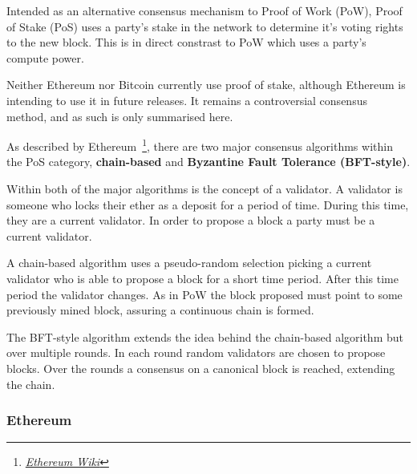 Intended as an alternative consensus mechanism to Proof of Work (PoW), Proof of Stake (PoS) uses a party's stake in the network to determine it's voting rights to the new block. This is in direct constrast to PoW which uses a party's compute power.

Neither Ethereum nor Bitcoin currently use proof of stake, although Ethereum is intending to use it in future releases. It remains a controversial consensus method, and as such is only summarised here.

As described by Ethereum~\footnote{\href{https://github.com/ethereum/wiki/wiki}{\textit{Ethereum Wiki}}}, there are two major consensus algorithms within the PoS category, \textbf{chain-based} and \textbf{Byzantine Fault Tolerance (BFT-style)}.

Within both of the major algorithms is the concept of a validator. A validator is someone who locks their ether as a deposit for a period of time. During this time, they are a current validator. In order to propose a block a party must be a current validator.

A chain-based algorithm uses a pseudo-random selection picking a current validator who is able to propose a block for a short time period. After this time period the validator changes. As in PoW the block proposed must point to some previously mined block, assuring a continuous chain is formed.

The BFT-style algorithm extends the idea behind the chain-based algorithm but over multiple rounds. In each round random validators are chosen to propose blocks. Over the rounds a consensus on a canonical block is reached, extending the chain.




\subsubsection{Ethereum}

